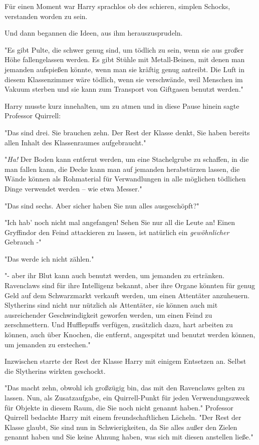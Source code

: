 {Für einen Moment war Harry sprachlos ob des schieren, simplen Schocks, verstanden worden zu sein.

Und dann begannen die Ideen, aus ihm herauszusprudeln.

"Es gibt Pulte, die schwer genug sind, um tödlich zu sein, wenn sie aus großer Höhe fallengelassen werden. Es gibt Stühle mit Metall-Beinen, mit denen man jemanden aufspießen könnte, wenn man sie kräftig genug antreibt. Die Luft in diesem Klassenzimmer wäre tödlich, wenn sie verschwände, weil Menschen im Vakuum sterben und sie kann zum Transport von Giftgasen benutzt werden."

Harry musste kurz innehalten, um zu atmen und in diese Pause hinein sagte Professor Quirrell:

"Das sind drei. Sie brauchen zehn. Der Rest der Klasse denkt, Sie haben bereits allen Inhalt des Klassenraumes aufgebraucht."

"\emph{Ha!} Der Boden kann entfernt werden, um eine Stachelgrube zu schaffen, in die man fallen kann, die Decke kann man auf jemanden herabstürzen lassen, die Wände können als Rohmaterial für Verwandlungen in alle möglichen tödlichen Dinge verwendet werden -- wie etwa Messer."

"Das sind sechs. Aber sicher haben Sie nun alles ausgeschöpft?"

"Ich hab' noch nicht mal angefangen! Sehen Sie nur all die Leute an! Einen Gryffindor den Feind attackieren zu lassen, ist natürlich ein \emph{gewöhnlicher} Gebrauch -"

"Das werde ich nicht zählen."

"- aber ihr Blut kann auch benutzt werden, um jemanden zu ertränken. Ravenclaws sind für ihre Intelligenz bekannt, aber ihre Organe könnten für genug Geld auf dem Schwarzmarkt verkauft werden, um einen Attentäter anzuheuern. Slytherins sind nicht nur nützlich als Attentäter, sie können auch mit ausreichender Geschwindigkeit geworfen werden, um einen Feind zu zerschmettern. Und Hufflepuffs verfügen, zusätzlich dazu, hart arbeiten zu können, auch über Knochen, die entfernt, angespitzt und benutzt werden können, um jemanden zu erstechen."

Inzwischen starrte der Rest der Klasse Harry mit einigem Entsetzen an. Selbst die Slytherins wirkten geschockt.

"Das macht zehn, obwohl ich großzügig bin, das mit den Ravenclaws gelten zu lassen. Nun, als Zusatzaufgabe, ein Quirrell-Punkt für jeden Verwendungszweck für Objekte in diesem Raum, die Sie noch nicht genannt haben." Professor Quirrell bedachte Harry mit einem freundschaftlichen Lächeln. "Der Rest der Klasse glaubt, Sie sind nun in Schwierigkeiten, da Sie alles außer den Zielen genannt haben und Sie keine Ahnung haben, was sich mit diesen anstellen ließe."

}
